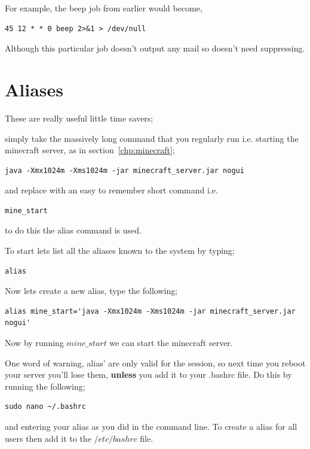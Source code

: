 For example, the beep job from earlier would become,

\begin{lstlisting}
45 12 * * 0 beep 2>&1 > /dev/null
\end{lstlisting}

Although this particular job doesn't output any mail so doesn't need suppressing.

\section{Aliases}
\label{sec:alias}

These are really useful little time savers;

simply take the massively long command that you regularly run i.e. starting the minecraft server, as in section~\ref{chp:minecraft};

\begin{lstlisting}
java -Xmx1024m -Xms1024m -jar minecraft_server.jar nogui
\end{lstlisting}

and replace with an easy to remember short command i.e.

\begin{lstlisting}
mine_start
\end{lstlisting}

to do this the alias command is used.

To start lets list all the aliases known to the system by typing;

\begin{lstlisting}
alias
\end{lstlisting}

Now lets create a new alias, type the following;

\begin{lstlisting}
alias mine_start='java -Xmx1024m -Xms1024m -jar minecraft_server.jar nogui'
\end{lstlisting}

Now by running $mine\_start$ we can start the minecraft server.

One word of warning, alias' are only valid for the session, so next time you reboot your server you'll lose them, \textbf{unless} you add it to your .bashrc file.  Do this by running the following;

\begin{lstlisting}
sudo nano ~/.bashrc
\end{lstlisting}

and entering your alias as you did in the command line.  To create a alias for all users then add it to the $/etc/bashrc$ file.

